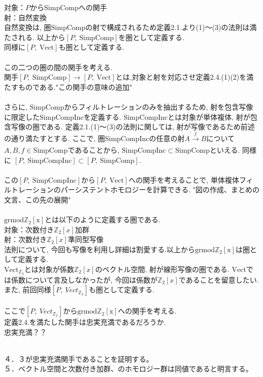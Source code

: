 \documentclass[a4paper]{jsarticle}
\theoremstyle{definition}
\newcommand{\SimpComp}{{\mathrm{SimpComp}}}
\newcommand{\Fun}[2]{[#1,~#2]}
\newcommand{\Vect}{{\mathrm{Vect}}}
\newcommand{\SimpCompInc}{{\mathrm{SimpCompInc}}}
\newcommand{\grmodZ}{{\mathrm{grmod \mathbb{Z}_2[x]}}}
\begin{document}
対象：$P$から$\SimpComp$への関手\\
射：自然変換\\
自然変換は, 圏$\SimpComp$の射で構成されるため定義2.1.より(1)～(3)の法則は満たされる. 以上から$\Fun{P}{\SimpComp}$を圏として定義する. \\
同様に$\Fun{P}{\Vect}$も圏として定義する. \\
\noindent\\
この二つの圏の間の関手を考える. \\
関手$\Fun{P}{\SimpComp}\rightarrow \Fun{P}{\Vect}$とは,対象と射を対応させ定義2.4.(1)(2)を満たすものである."この関手の意味の追加"\\
\noindent\\
さらに, $\SimpComp$からフィルトレーションのみを抽出するため, 射を包含写像に限定した$\SimpCompInc$を定義する. $\SimpCompInc$とは対象が単体複体, 射が包含写像の圏である. 定義2.1.(1)～(3)の法則に関しては, 射が写像であるため前述の通り満たすとする. ここで, 圏$\SimpCompInc$の任意の射$A\xrightarrow[]{f} B$について$A, B, f\in \SimpComp$であることから, $\SimpCompInc\subset \SimpComp$といえる. 同様に $\Fun{P}{\SimpCompInc}\subset \Fun{P}{\SimpComp}$.\\
\noindent\\
この$\Fun{P}{\SimpCompInc}$から$\Fun{P}{\Vect}$への関手を考えることで, 単体複体フィルトレーションのパーシステントホモロジーを計算できる. "図の作成、まとめの文言、この先の展開"\\
\noindent\\
$\grmodZ$とは以下のように定義する圏である.\\
対象：次数付き$\mathbb{Z}_2[x]$加群\\
射：次数付き$\mathbb{Z}_2[x]$準同型写像\\
法則について, 今回も写像を利用し詳細は割愛する.以上から$\grmodZ$は圏として定義する. 
\noindent\\
$\Vect_{\mathbb{Z}_2}$とは対象が係数$\mathbb{Z}_2[x]$のベクトル空間, 射が線形写像の圏である. $\Vect$では係数について言及しなかったが, 今回は係数が$\mathbb{Z}_2[x]$であることを留意したい.\\
また, 前回同様$\Fun{P}{Vect_{\mathbb{Z}_2}}$も圏として定義する.\\
\noindent\\
ここで$\Fun{P}{Vect_{\mathbb{Z}_2}}$から$\grmodZ$への関手を考える.\\
定義2.4.を満たした関手は忠実充満であるだろうか.\\
忠実充満？？






\noindent\\
４．３が忠実充満関手であることを証明する。\\
５．ベクトル空間と次数付き加群、のホモロジー群は同値であると明言する。\\
\end{document}
